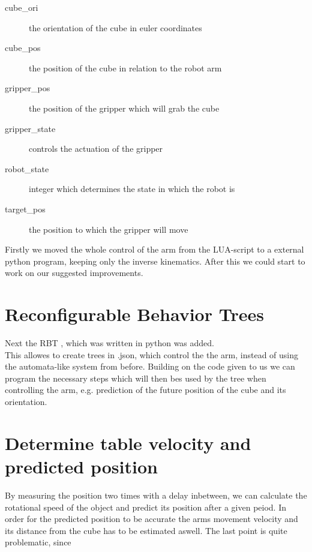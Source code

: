 \documentclass[report]{iisthesis}
\begin{document}
\begin{description}
    \item [cube\_ori] the orientation of the cube in euler coordinates 
    \item [cube\_pos] the position of the cube in relation to the robot arm
    \item [gripper\_pos] the position of the gripper which will grab the cube
    \item [gripper\_state] controls the actuation of the gripper
    \item [robot\_state] integer which determines the state in which the robot is 
    \item [target\_pos] the position to which the gripper will move
\end{description}
\noindent
Firstly we moved the whole control of the arm from the LUA-script to a external python program, keeping only the inverse kinematics.
After this we could start to work on our suggested improvements. 

\section{Reconfigurable Behavior Trees}
Next the RBT \cite{DBLP:journals/corr/abs-2007-10663}, which was written in python was added. \\
This allowes to create trees in .json, which control the the arm, instead of using the automata-like system
from before.
Building on the code given to us we can program the necessary steps which will then bes used by the tree when controlling the arm, e.g. prediction of
the future position of the cube and its orientation.

\section{Determine table velocity and predicted position}
By measuring the position two times with a delay inbetween, we can calculate the rotational speed of the object and predict its position after a given peiod.
In order for the predicted position to be accurate the arms movement velocity and its distance from the cube has to be estimated aswell.
The last point is quite problematic, since 
\end{document}
